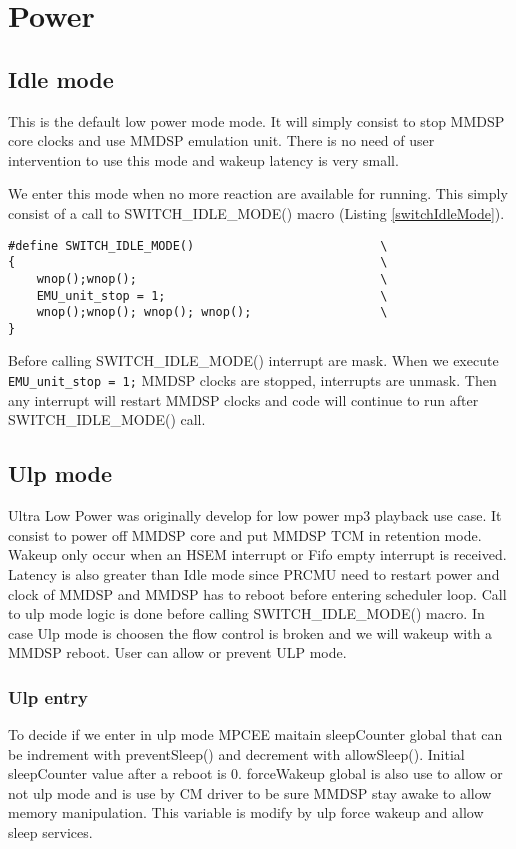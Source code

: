 \chapter{Power}
\section{Idle mode}
This is the default low power mode mode. It will simply consist to stop MMDSP
core clocks and use MMDSP emulation unit. There is no need of user intervention
to use this mode and wakeup latency is very small.

We enter this mode when no more reaction are available for running. This simply
consist of a call to SWITCH\_IDLE\_MODE() macro (Listing \ref{switchIdleMode}).

\begin{lstlisting}[caption=SWITCH\_IDLE\_MODE() macro
definition,label=switchIdleMode]
#define SWITCH_IDLE_MODE()                          \
{                                                   \
    wnop();wnop();                                  \
    EMU_unit_stop = 1;                              \
    wnop();wnop(); wnop(); wnop();                  \
}
\end{lstlisting}

Before calling SWITCH\_IDLE\_MODE() interrupt are mask. When we execute
\verb#EMU_unit_stop = 1;# MMDSP clocks are stopped, interrupts are unmask. Then
any interrupt will restart MMDSP clocks and code will continue to run after
SWITCH\_IDLE\_MODE() call.

\section{Ulp mode}
Ultra Low Power was originally develop for low power mp3 playback use case. It
consist to power off MMDSP core and put MMDSP TCM in retention mode. Wakeup only
occur when an HSEM interrupt or Fifo empty interrupt is received. Latency is
also greater than Idle mode since PRCMU need to restart power and clock of MMDSP
and MMDSP has to reboot before entering scheduler loop. Call to ulp mode logic
is done before calling SWITCH\_IDLE\_MODE() macro. In case Ulp mode is choosen
the flow control is broken and we will wakeup with a MMDSP reboot. User can
allow or prevent ULP mode.

\subsection{Ulp entry}
To decide if we enter in ulp mode MPCEE maitain sleepCounter global that can be
indrement with preventSleep() and decrement with allowSleep(). Initial
sleepCounter value after a reboot is 0.
forceWakeup global is also use to allow or not ulp mode and is use by CM driver
to be sure MMDSP stay awake to allow memory manipulation. This variable is
modify by ulp force wakeup and allow sleep services.

